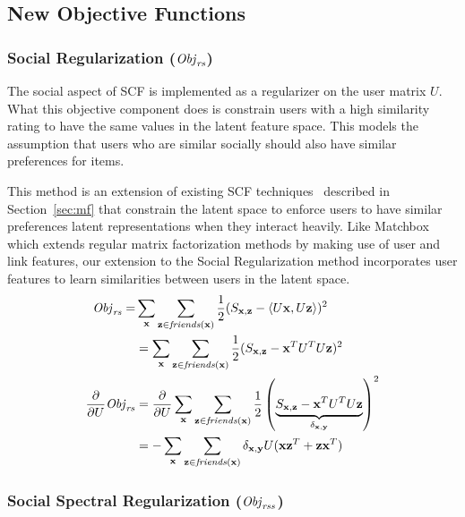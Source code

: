 \subsection{New Objective Functions}

\subsubsection{Social Regularization ($\mathit{Obj}_{\mathit{rs}}$)}
\label{sec:SocRec}

The social aspect of SCF is implemented as a regularizer on the user
matrix $U$. What this objective component does is constrain users with
a high similarity rating to have the same values in the latent feature
space. This models the assumption that users who are similar socially
should also have similar preferences for items.

This method is an extension of existing SCF
techniques~\cite{lla,socinf} described in Section~\ref{sec:mf} that
constrain the latent space to enforce users to have similar
preferences latent representations when they interact heavily.  Like
Matchbox which extends regular matrix factorization methods by making
use of user and link features, our extension to the Social
Regularization method incorporates user features to learn similarities
between users in the latent space.
\begin{align}
\mathit{Obj}_{\mathit{rs}} = & \sum_{\mathbf{x}} \sum_{\mathbf{z} \in \mathit{friends}(\mathbf{x})} \frac{1}{2} (S_{\mathbf{x},\mathbf{z}} - \langle U\mathbf{x}, U\mathbf{z} \rangle)^2 \\
& = \sum_{\mathbf{x}} \sum_{\mathbf{z} \in \mathit{friends}(\mathbf{x})} \frac{1}{2} (S_{\mathbf{x},\mathbf{z}} - \mathbf{x}^T U^T U \mathbf{z})^2 \nonumber \\
\frac{\partial}{\partial U} \mathit{Obj}_{\mathit{rs}} & = \frac{\partial}{\partial U} \sum_{\mathbf{x}} \sum_{\mathbf{z} \in \mathit{friends}(\mathbf{x})} \frac{1}{2} \left( \underbrace{S_{\mathbf{x},\mathbf{z}} - \mathbf{x}^T U^T U \mathbf{z}}_{\delta_{\mathbf{x},\mathbf{y}}} \right)^2 \nonumber \\
& = - \sum_{\mathbf{x}} \sum_{\mathbf{z} \in \mathit{friends}(\mathbf{x})} \delta_{\mathbf{x},\mathbf{y}} U (\mathbf{x} \mathbf{z}^T + \mathbf{z} \mathbf{x}^T) \nonumber
\end{align}

\subsubsection{Social Spectral Regularization ($\mathit{Obj}_{\mathit{rss}}$)}

